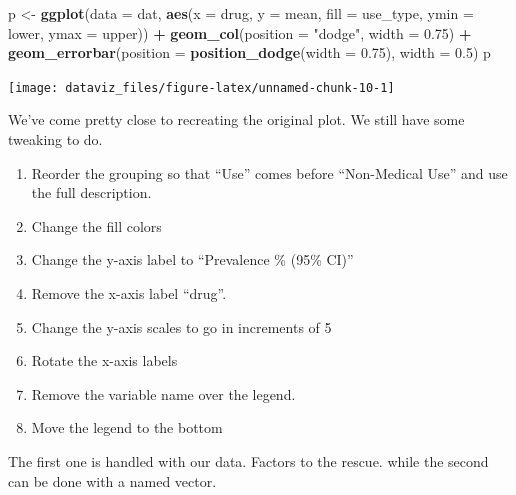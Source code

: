 \documentclass[]{book}
\newenvironment{Shaded}{\begin{snugshade}}{\end{snugshade}}
\newcommand{\DataTypeTok}[1]{\textcolor[rgb]{0.13,0.29,0.53}{#1}}
\newcommand{\FloatTok}[1]{\textcolor[rgb]{0.00,0.00,0.81}{#1}}
\newcommand{\KeywordTok}[1]{\textcolor[rgb]{0.13,0.29,0.53}{\textbf{#1}}}
\newcommand{\NormalTok}[1]{#1}
\newcommand{\OperatorTok}[1]{\textcolor[rgb]{0.81,0.36,0.00}{\textbf{#1}}}
\newcommand{\StringTok}[1]{\textcolor[rgb]{0.31,0.60,0.02}{#1}}
\providecommand{\tightlist}{%
  \setlength{\itemsep}{0pt}\setlength{\parskip}{0pt}}
\theoremstyle{definition}
\theoremstyle{definition}
\theoremstyle{definition}
\theoremstyle{remark}
\begin{document}
\begin{Shaded}
\begin{Highlighting}[]
\NormalTok{p <-}\StringTok{ }\KeywordTok{ggplot}\NormalTok{(}\DataTypeTok{data =}\NormalTok{ dat, }\KeywordTok{aes}\NormalTok{(}\DataTypeTok{x =}\NormalTok{ drug, }\DataTypeTok{y =}\NormalTok{ mean, }\DataTypeTok{fill =}\NormalTok{ use_type, }\DataTypeTok{ymin =}\NormalTok{ lower, }\DataTypeTok{ymax =}\NormalTok{ upper)) }\OperatorTok{+}
\StringTok{  }\KeywordTok{geom_col}\NormalTok{(}\DataTypeTok{position =} \StringTok{"dodge"}\NormalTok{, }\DataTypeTok{width =} \FloatTok{0.75}\NormalTok{) }\OperatorTok{+}
\StringTok{  }\KeywordTok{geom_errorbar}\NormalTok{(}\DataTypeTok{position =} \KeywordTok{position_dodge}\NormalTok{(}\DataTypeTok{width =} \FloatTok{0.75}\NormalTok{), }\DataTypeTok{width =} \FloatTok{0.5}\NormalTok{)}
\NormalTok{p}
\end{Highlighting}
\end{Shaded}

\begin{center}\texttt{[image: dataviz\_files/figure-latex/unnamed-chunk-10-1]} \end{center}

We've come pretty close to recreating the original plot. We still have
some tweaking to do.

\begin{enumerate}
\def\labelenumi{\arabic{enumi}.}
\tightlist
\item
  Reorder the grouping so that ``Use'' comes before ``Non-Medical Use''
  and use the full description.
\item
  Change the fill colors
\item
  Change the y-axis label to ``Prevalence \% (95\% CI)''
\item
  Remove the x-axis label ``drug''.
\item
  Change the y-axis scales to go in increments of 5
\item
  Rotate the x-axis labels
\item
  Remove the variable name over the legend.
\item
  Move the legend to the bottom
\end{enumerate}

The first one is handled with our data. Factors to the rescue. while the
second can be done with a named vector.
\end{document}
